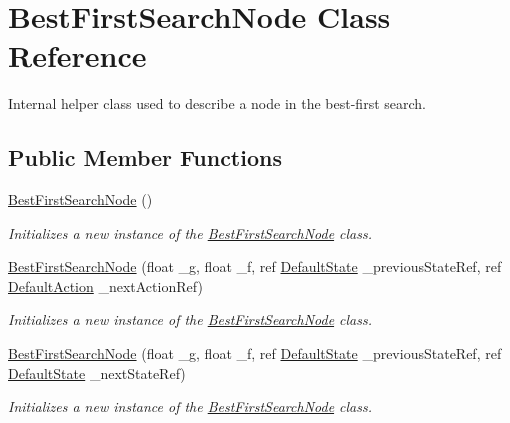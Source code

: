 \hypertarget{class_best_first_search_node}{\section{Best\-First\-Search\-Node Class Reference}
\label{class_best_first_search_node}
}


Internal helper class used to describe a node in the best-\/first search.  


\subsection*{Public Member Functions}
\begin{DoxyCompactItemize}
\item 
\hyperlink{class_best_first_search_node_acd51a5e054826ba7b3b56fadc77aed2e}{Best\-First\-Search\-Node} ()
\begin{DoxyCompactList}\small\item\em Initializes a new instance of the \hyperlink{class_best_first_search_node}{Best\-First\-Search\-Node} class. \end{DoxyCompactList}\item 
\hyperlink{class_best_first_search_node_afda8aef3a27e03d5d6252058970ea2f1}{Best\-First\-Search\-Node} (float \-\_\-g, float \-\_\-f, ref \hyperlink{class_default_state}{Default\-State} \-\_\-previous\-State\-Ref, ref \hyperlink{class_default_action}{Default\-Action} \-\_\-next\-Action\-Ref)
\begin{DoxyCompactList}\small\item\em Initializes a new instance of the \hyperlink{class_best_first_search_node}{Best\-First\-Search\-Node} class. \end{DoxyCompactList}\item 
\hyperlink{class_best_first_search_node_a4f3a23969ff7be7dcc574232dc2c6344}{Best\-First\-Search\-Node} (float \-\_\-g, float \-\_\-f, ref \hyperlink{class_default_state}{Default\-State} \-\_\-previous\-State\-Ref, ref \hyperlink{class_default_state}{Default\-State} \-\_\-next\-State\-Ref)
\begin{DoxyCompactList}\small\item\em Initializes a new instance of the \hyperlink{class_best_first_search_node}{Best\-First\-Search\-Node} class. \end{DoxyCompactList}\end{DoxyCompactItemize}
